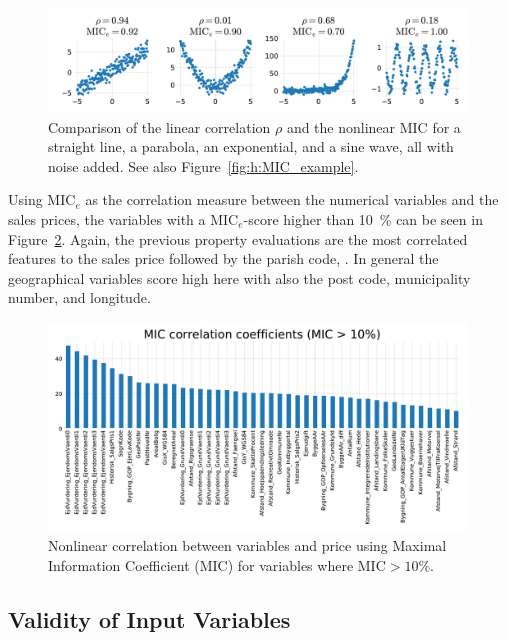 \begin{figure}
  \centerfloat
  \includegraphics[width=0.99\textwidth, trim=10 10 10 10, clip]{figures/housing/MIC_test_small.pdf}
  \caption[Comparison of the Linear Correlation $\rho$ and the Nonlinear MIC]
          {Comparison of the linear correlation $\rho$ and the nonlinear MIC for a straight line, a parabola, an exponential, and a sine wave, all with noise added. See also Figure~\ref{fig:h:MIC_example}.}
  \label{fig:h:MIC_example_small}
\end{figure}

Using $\mathrm{MIC}_e$ as the correlation measure between the numerical variables and the sales prices, the variables with a $\mathrm{MIC}_e$-score higher than \SI{10}{\percent} can be seen in Figure~\ref{fig:h:corr_MIC}. Again, the previous property evaluations are the most correlated features to the sales price followed by the parish code, . In general the geographical variables score high here with also the post code, municipality number, and longitude. 

\begin{figure}
  \centerfloat
  \includegraphics[width=0.99\textwidth, trim=10 10 0 40, clip]{figures/housing/MIC_plot.pdf}
  \caption[Nonlinear Correlation Between Variables and Price]
          {Nonlinear correlation between variables and price using Maximal Information Coefficient (MIC) for variables where $\text{MIC}>10\%$.}
  \label{fig:h:corr_MIC}
\end{figure}

\subsection{Validity of Input Variables}


